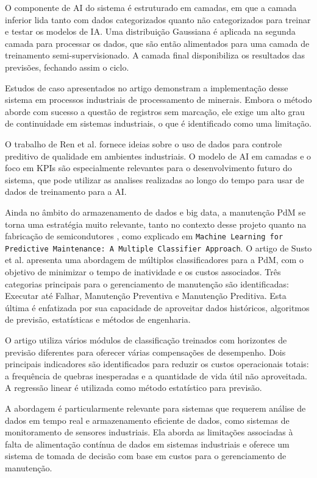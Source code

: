 O componente de \gls{AI} do sistema é estruturado em camadas, em que a camada inferior lida tanto com dados categorizados quanto não categorizados para treinar e testar os modelos de IA. Uma distribuição Gaussiana é aplicada na segunda camada para processar os dados, que são então alimentados para uma camada de treinamento semi-supervisionado. A camada final disponibiliza os resultados das previsões, fechando assim o ciclo.

Estudos de caso apresentados no artigo demonstram a implementação desse sistema em processos industriais de processamento de minerais. Embora o método aborde com sucesso a questão de registros sem marcação, ele exige um alto grau de continuidade em sistemas industriais, o que é identificado como uma limitação.

O trabalho de Ren et al. fornece ideias sobre o uso de dados para controle preditivo de qualidade em ambientes industriais. O modelo de \gls{AI} em camadas e o foco em KPIs são especialmente relevantes para o desenvolvimento futuro do sistema, que pode utilizar as analises realizadas ao longo do tempo para usar de dados de treinamento para a \gls{AI}.


Ainda no âmbito do armazenamento de dados e big data, a manutenção \gls{PdM} se torna uma estratégia muito relevante, tanto no contexto desse projeto quanto na fabricação de semicondutores \cite{susto2015machine}, como explicado em \texttt{Machine Learning for Predictive Maintenance: A Multiple Classifier Approach}. O artigo de Susto et al.\cite{susto2015machine} apresenta uma abordagem de múltiplos classificadores para a \gls{PdM}, com o objetivo de minimizar o tempo de inatividade e os custos associados. Três categorias principais para o gerenciamento de manutenção são identificadas: Executar até Falhar, Manutenção Preventiva e Manutenção Preditiva. Esta última é enfatizada por sua capacidade de aproveitar dados históricos, algoritmos de previsão, estatísticas e métodos de engenharia.

O artigo utiliza vários módulos de classificação treinados com horizontes de previsão diferentes para oferecer várias compensações de desempenho. Dois principais indicadores são identificados para reduzir os custos operacionais totais: a frequência de quebras inesperadas e a quantidade de vida útil não aproveitada. A regressão linear é utilizada como método estatístico para previsão.

A abordagem é particularmente relevante para sistemas que requerem análise de dados em tempo real e armazenamento eficiente de dados, como sistemas de monitoramento de sensores industriais. Ela aborda as limitações associadas à falta de alimentação contínua de dados em sistemas industriais e oferece um sistema de tomada de decisão com base em custos para o gerenciamento de manutenção.

